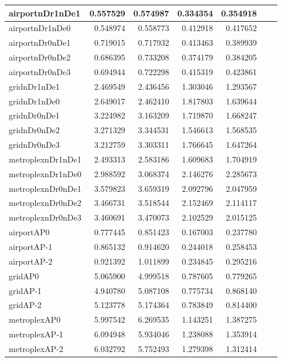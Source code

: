 \begin{longtable}{|l|r|r|r|r|r|r|}
\endlastfoot
airportnDr1nDe1 & 0.557529 & 0.574987 & 0.334354 & 0.354918 \\ \hline
airportnDr1nDe0 & 0.548974 & 0.558773 & 0.412918 & 0.417652 \\ \hline
airportnDr0nDe1 & 0.719015 & 0.717932 & 0.413463 & 0.389939 \\ \hline
airportnDr0nDe2 & 0.686395 & 0.733208 & 0.374179 & 0.384205 \\ \hline
airportnDr0nDe3 & 0.694944 & 0.722298 & 0.415319 & 0.423861 \\ \hline
gridnDr1nDe1 & 2.469549 & 2.436456 & 1.303046 & 1.293567 \\ \hline
gridnDr1nDe0 & 2.649017 & 2.462410 & 1.817803 & 1.639644 \\ \hline
gridnDr0nDe1 & 3.224982 & 3.163209 & 1.719870 & 1.668247 \\ \hline
gridnDr0nDe2 & 3.271329 & 3.344531 & 1.546613 & 1.568535 \\ \hline
gridnDr0nDe3 & 3.212759 & 3.303311 & 1.766645 & 1.647264 \\ \hline
metroplexnDr1nDe1 & 2.493313 & 2.583186 & 1.609683 & 1.704919 \\ \hline
metroplexnDr1nDe0 & 2.988592 & 3.068374 & 2.146276 & 2.285673 \\ \hline
metroplexnDr0nDe1 & 3.579823 & 3.659319 & 2.092796 & 2.047959 \\ \hline
metroplexnDr0nDe2 & 3.466731 & 3.518544 & 2.152469 & 2.114117 \\ \hline
metroplexnDr0nDe3 & 3.460691 & 3.470073 & 2.102529 & 2.015125 \\ \hline
airportAP0 & 0.777445 & 0.851423 & 0.167003 & 0.237780 \\ \hline
airportAP-1 & 0.865132 & 0.914620 & 0.244018 & 0.258453 \\ \hline
airportAP-2 & 0.921392 & 1.011899 & 0.234845 & 0.295216 \\ \hline
gridAP0 & 5.065900 & 4.999518 & 0.787605 & 0.779265 \\ \hline
gridAP-1 & 4.940780 & 5.087108 & 0.775734 & 0.868140 \\ \hline
gridAP-2 & 5.123778 & 5.174364 & 0.783849 & 0.814400 \\ \hline
metroplexAP0 & 5.997542 & 6.269535 & 1.143251 & 1.387275 \\ \hline
metroplexAP-1 & 6.094948 & 5.934046 & 1.238088 & 1.353914 \\ \hline
metroplexAP-2 & 6.032792 & 5.752493 & 1.279398 & 1.312414 \\ \hline

\end{longtable}
